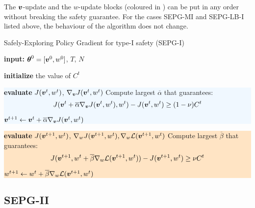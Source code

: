\begin{note}
The $\boldsymbol{v}$-update and the $w$-update blocks (coloured in ) can be put in any order without breaking the safety guarantee. For the cases SEPG-MI and SEPG-LB-I listed above, the behaviour of the algorithm does not change. 
\end{note}
\begin{algorithm}[t]
\caption{Safely-Exploring Policy Gradient for type-I safety (SEPG-I)}
    \label{alg:sepg-I}
    \begin{algorithmic}[1] 
	\State \textbf{input:} ${\boldsymbol{\theta}}^0 = [\boldsymbol{v}^0, w^0]$, $T$, $N$

        	\State \textbf{initialize} the value of $C^t$ \label{alg:set-ct}
        	\newline
        	\hspace*{-\fboxsep}\colorbox{aliceblue}{\parbox{\linewidth}{
            \State \textbf{evaluate} $J(\boldsymbol{v}^t,w^t)$, $\nabla_{\boldsymbol{v}}{J(\boldsymbol{v}^t,w^t)}$ 
			\State Compute largest $\overline{\alpha}$ that guarantees: $$J(\boldsymbol{v}^t + \overline{\alpha} \nabla_{\boldsymbol{v}}J(\boldsymbol{v}^t, w^t), w^t) - J(\boldsymbol{v}^t, w^t) \geq (1-\nu)C^t$$

            \State $\boldsymbol{v}^{t+1} \gets \boldsymbol{v}^t + \overline{\alpha}\nabla_{\boldsymbol{v}}{J(\boldsymbol{v}^t, w^t)}$  }}

		\State\newline
		\hspace*{-\fboxsep}\colorbox{bisque}{\parbox{\linewidth}{
            
            \State \textbf{evaluate} $J(\boldsymbol{v}^{t+1}, w^t)$, $\nabla_{w}{J(\boldsymbol{v}^{t+1}, w^t)}, \nabla_{w}\mathcal{L}(\boldsymbol{v}^{t+1},w^t)$ 
            \State Compute largest $\overline{\beta}$ that guarantees:
            \State \[J(\boldsymbol{v}^{t+1}, w^t + \overline{\beta} \nabla_{w}\mathcal{L}(\boldsymbol{v}^{t+1}, w^t)) - J(\boldsymbol{v}^{t+1}, w^t) \geq \nu C^t\] 

            \State $w^{t+1} \gets w^t + \overline{ \beta}\nabla_{w}\mathcal{L}(\boldsymbol{v}^{t+1},w^t)$      }}       
        \EndFor
    \end{algorithmic}
\end{algorithm}


\subsection{SEPG-II}

